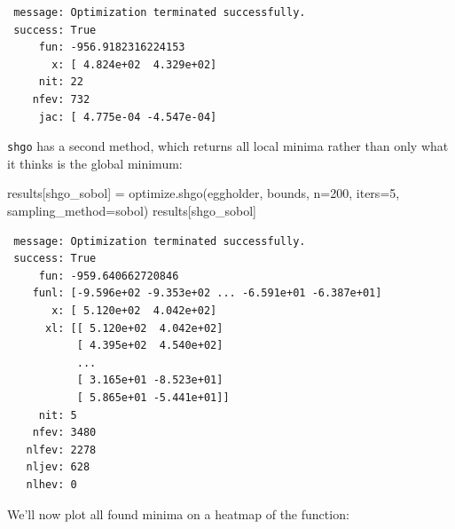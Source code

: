 \documentclass[
  letterpaper,
  DIV=11,
  numbers=noendperiod]{scrreprt}
\newenvironment{Shaded}{\begin{snugshade}}{\end{snugshade}}
\newcommand{\DecValTok}[1]{\textcolor[rgb]{0.68,0.00,0.00}{#1}}
\newcommand{\NormalTok}[1]{\textcolor[rgb]{0.00,0.23,0.31}{#1}}
\newcommand{\OperatorTok}[1]{\textcolor[rgb]{0.37,0.37,0.37}{#1}}
\newcommand{\StringTok}[1]{\textcolor[rgb]{0.13,0.47,0.30}{#1}}
\begin{document}
\begin{verbatim}
 message: Optimization terminated successfully.
 success: True
     fun: -956.9182316224153
       x: [ 4.824e+02  4.329e+02]
     nit: 22
    nfev: 732
     jac: [ 4.775e-04 -4.547e-04]
\end{verbatim}

\texttt{shgo} has a second method, which returns all local minima rather
than only what it thinks is the global minimum:

\begin{Shaded}
\begin{Highlighting}[]
\NormalTok{results[}\StringTok{\textquotesingle{}shgo\_sobol\textquotesingle{}}\NormalTok{] }\OperatorTok{=}\NormalTok{ optimize.shgo(eggholder, bounds, n}\OperatorTok{=}\DecValTok{200}\NormalTok{, iters}\OperatorTok{=}\DecValTok{5}\NormalTok{,}
\NormalTok{                                      sampling\_method}\OperatorTok{=}\StringTok{\textquotesingle{}sobol\textquotesingle{}}\NormalTok{)}
\NormalTok{results[}\StringTok{\textquotesingle{}shgo\_sobol\textquotesingle{}}\NormalTok{]}
\end{Highlighting}
\end{Shaded}

\begin{verbatim}
 message: Optimization terminated successfully.
 success: True
     fun: -959.640662720846
    funl: [-9.596e+02 -9.353e+02 ... -6.591e+01 -6.387e+01]
       x: [ 5.120e+02  4.042e+02]
      xl: [[ 5.120e+02  4.042e+02]
           [ 4.395e+02  4.540e+02]
           ...
           [ 3.165e+01 -8.523e+01]
           [ 5.865e+01 -5.441e+01]]
     nit: 5
    nfev: 3480
   nlfev: 2278
   nljev: 628
   nlhev: 0
\end{verbatim}

We'll now plot all found minima on a heatmap of the function:
\end{document}
